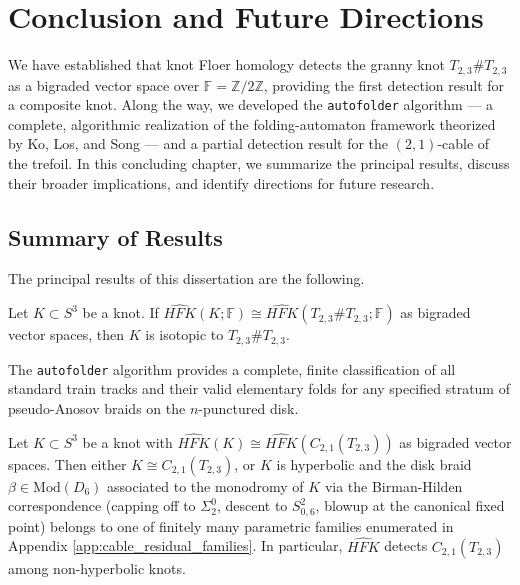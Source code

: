\chapter{Conclusion and Future Directions}\label{chap:conclusion}

We have established that knot Floer homology detects the granny knot $T_{2,3}\# T_{2,3}$ as a bigraded vector space over $\mathbb{F} = \mathbb{Z}/2\mathbb{Z}$, providing the first detection result for a composite knot. Along the way, we developed the \texttt{autofolder} algorithm — a complete, algorithmic realization of the folding-automaton framework theorized by Ko, Los, and Song — and a partial detection result for the $(2,1)$-cable of the trefoil. In this concluding chapter, we summarize the principal results, discuss their broader implications, and identify directions for future research.

\section{Summary of Results}

The principal results of this dissertation are the following.

\begin{theorem}
Let $K \subset S^3$ be a knot. If $\widehat{HFK}(K; \mathbb{F}) \cong \widehat{HFK}(T_{2,3}\#T_{2,3}; \mathbb{F})$ as bigraded vector spaces, then $K$ is isotopic to $T_{2,3}\# T_{2,3}$.
\end{theorem}

\begin{theorem}
The \texttt{autofolder} algorithm provides a complete, finite classification of all standard train tracks and their valid elementary folds for any specified stratum of pseudo-Anosov braids on the $n$-punctured disk.
\end{theorem}

\begin{theorem}
Let $K \subset S^3$ be a knot with $\widehat{HFK}(K) \cong \widehat{HFK}(C_{2,1}(T_{2,3}))$ as bigraded vector spaces. Then either $K \cong C_{2,1}(T_{2,3})$, or $K$ is hyperbolic and the disk braid $\beta \in \mathrm{Mod}(D_6)$ associated to the monodromy of $K$ via the Birman-Hilden correspondence (capping off to $\Sigma_2^0$, descent to $S^2_{0,6}$, blowup at the canonical fixed point) belongs to one of finitely many parametric families enumerated in Appendix \ref{app:cable_residual_families}. In particular, $\widehat{HFK}$ detects $C_{2,1}(T_{2,3})$ among non-hyperbolic knots.
\end{theorem}

